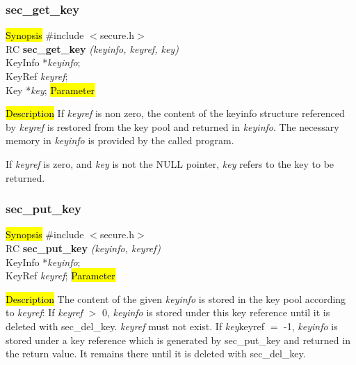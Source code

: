 \subsubsection{sec\_get\_key}
\label{sec_get_key}
\hl{Synopsis}
\#include $<$secure.h$>$ \\ [0.5cm]
RC {\bf sec\_get\_key} {\em (keyinfo, keyref, key)} \\
KeyInfo *{\em keyinfo}; \\
KeyRef {\em keyref}; \\
Key *{\em key};
\hl{Parameter}



\hl{Description}
If {\em keyref} is non zero, the content of the keyinfo structure referenced 
by {\em keyref} is restored from the key pool and returned 
in {\em keyinfo}. The necessary memory in {\em keyinfo} is provided
by the called program. 

If {\em keyref} is zero, and {\em key} is not the NULL pointer, {\em key}
refers to the key to be returned.

\subsubsection{sec\_put\_key}
\label{sec_put_key}
\hl{Synopsis}
\#include $<$secure.h$>$ \\ [0.5cm]
RC {\bf sec\_put\_key} {\em (keyinfo, keyref)} \\
KeyInfo *{\em keyinfo}; \\
KeyRef {\em keyref};
\hl{Parameter}


\hl{Description}
The content of the given {\em keyinfo} is stored in the key pool according to {\em keyref}: 
\be
\m If {\em keyref} $>$ 0, {\em keyinfo} is stored under this key reference until it is
   deleted with sec\_del\_key. {\em keyref} must not exist.
\m If {\em key}\pf keyref $=$ -1, {\em keyinfo} is stored under a key reference which is generated 
   by sec\_put\_key and returned in the return value. It remains there until it is deleted
   with sec\_del\_key.
\ee

